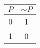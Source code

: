 \begin{tabular}{|c||c|}
\hline
$ P $ & $  \sim P $ \\
\hline
0 & 1 \\
1 & 0 \\
\hline
\end{tabular}
